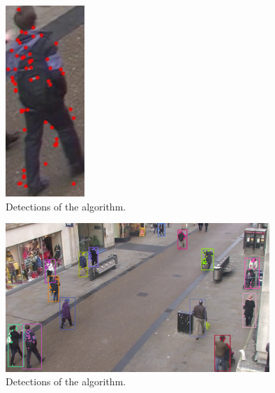 \begin{figure}[H]
\centering         
\includegraphics[width=3cm]{implementation/pointsEQU.jpg}
\caption{Detections of the algorithm.} \label{objectDetector1}
\end{figure}


\begin{figure}[H]
\centering         
\includegraphics[width=10cm]{intro/pounts.jpg}
\caption{Detections of the algorithm.} \label{objectDetector1}
\end{figure}

 





